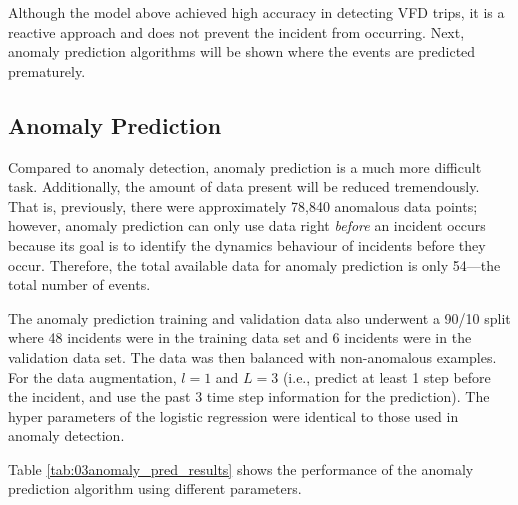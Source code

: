 Although the model above achieved high accuracy in detecting VFD trips, it is a reactive approach and does not prevent the incident from occurring.  Next, anomaly prediction algorithms will be shown where the events are predicted prematurely.  

\subsection{Anomaly Prediction}
Compared to anomaly detection, anomaly prediction is a much more difficult task.  Additionally, the amount of data present will be reduced tremendously.  That is, previously, there were approximately 78,840 anomalous data points; however, anomaly prediction can only use data right \textit{before} an incident occurs because its goal is to identify the dynamics behaviour of incidents before they occur.
Therefore, the total available data for anomaly prediction is only 54---the total number of events.

The anomaly prediction training and validation data also underwent a 90/10 split where 48 incidents were in the training data set and 6 incidents were in the validation data set. The data was then balanced with non-anomalous examples.  For the data augmentation, $l = 1$ and $L = 3$ (i.e., predict at least 1 step before the incident, and use the past 3 time step information for the prediction). The hyper parameters of the logistic regression were identical to those used in anomaly detection.

Table \ref{tab:03anomaly_pred_results} shows the performance of the anomaly prediction algorithm using different parameters.

